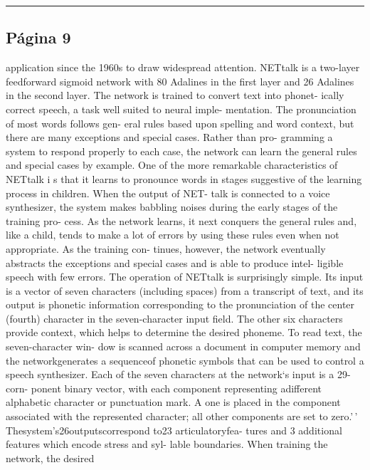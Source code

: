 \begin{center}\rule{0.5\linewidth}{0.5pt}\end{center}

\subsection{Página 9}\label{puxe1gina-9}

application since the 1960s to draw widespread attention. NETtalk is a
two-layer feedforward sigmoid network with 80 Adalines in the first
layer and 26 Adalines in the second layer. The network is trained to
convert text into phonet- ically correct speech, a task well suited to
neural imple- mentation. The pronunciation of most words follows gen-
eral rules based upon spelling and word context, but there are many
exceptions and special cases. Rather than pro- gramming a system to
respond properly to each case, the network can learn the general rules
and special cases by example. One of the more remarkable characteristics
of NETtalk i s that it learns to pronounce words in stages suggestive of
the learning process in children. When the output of NET- talk is
connected to a voice synthesizer, the system makes babbling noises
during the early stages of the training pro- cess. As the network
learns, it next conquers the general rules and, like a child, tends to
make a lot of errors by using these rules even when not appropriate. As
the training con- tinues, however, the network eventually abstracts the
exceptions and special cases and is able to produce intel- ligible
speech with few errors. The operation of NETtalk is surprisingly simple.
Its input is a vector of seven characters (including spaces) from a
transcript of text, and its output is phonetic information corresponding
to the pronunciation of the center (fourth) character in the
seven-character input field. The other six characters provide context,
which helps to determine the desired phoneme. To read text, the
seven-character win- dow is scanned across a document in computer memory
and the networkgenerates a sequenceof phonetic symbols that can be used
to control a speech synthesizer. Each of the seven characters at the
network`s input is a 29-corn- ponent binary vector, with each component
representing adifferent alphabetic character or punctuation mark. A one
is placed in the component associated with the represented character;
all other components are set to zero.'\,' Thesystem's26outputscorrespond
to23 articulatoryfea- tures and 3 additional features which encode
stress and syl- lable boundaries. When training the network, the desired
